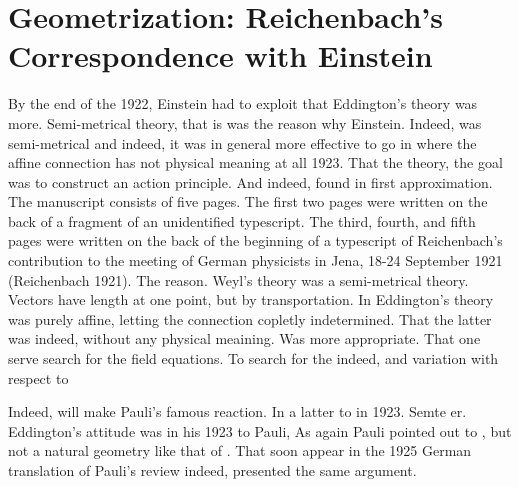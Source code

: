 \documentclass[draft]{article}
\begin{document}






\section{Geometrization: Reichenbach's Correspondence with Einstein}

By the end of the 1922, Einstein had to exploit that Eddington's theory was more. Semi-metrical theory, that is was the reason why Einstein. Indeed, was semi-metrical and indeed, it was in general more effective to go in where the affine connection has not physical meaning at all 1923. That the theory, the goal was to construct an action principle. And indeed, found in first approximation. The manuscript consists of five pages. The first two pages were written on the back of a fragment of an unidentified typescript. The third, fourth, and fifth pages were written on the back of the beginning of a typescript of Reichenbach’s contribution to the meeting of German physicists in Jena, 18-24 September 1921 (Reichenbach 1921). The reason. Weyl's theory was a semi-metrical theory. Vectors have length at one point, but by transportation. In Eddington's theory was purely affine, letting the connection copletly indetermined. That the latter was indeed, without any physical meaining. Was more appropriate. That one serve search for the field equations. To search for the indeed, and variation with respect to 

Indeed, will make Pauli's famous reaction. In a latter to in 1923. Semte er.  Eddington's attitude was in his 1923 to Pauli, As again Pauli pointed out to , but not a natural geometry like that of \rac. That soon appear in the 1925 German translation of   Pauli's review indeed, presented the same argument.
\end{document}
